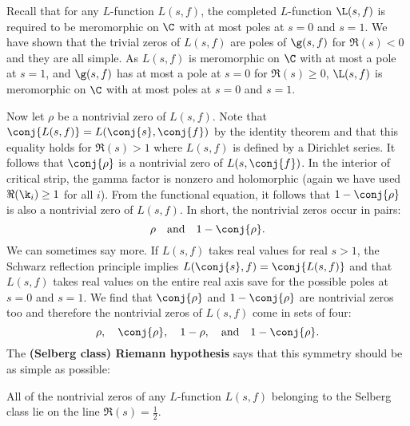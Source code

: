     \begin{remark}\label{rem:poles_of_completed_L_function}
      Recall that for any $L$-function $L(s,f)$, the completed $L$-function $\L(s,f)$ is required to be meromorphic on $\C$ with at most poles at $s = 0$ and $s = 1$. We have shown that the trivial zeros of $L(s,f)$ are poles of $\g(s,f)$ for $\Re(s) < 0$ and they are all simple. As $L(s,f)$ is meromorphic on $\C$ with at most a pole at $s = 1$, and $\g(s,f)$ has at most a pole at $s = 0$ for $\Re(s) \ge 0$, $\L(s,f)$ is meromorphic on $\C$ with at most poles at $s = 0$ and $s = 1$.
    \end{remark}
    
    Now let $\rho$ be a nontrivial zero of $L(s,f)$. Note that $\conj{L(s,f)} = L(\conj{s},\conj{f})$ by the identity theorem and that this equality holds for $\Re(s) > 1$ where $L(s,f)$ is defined by a Dirichlet series. It follows that $\conj{\rho}$ is a nontrivial zero of $L(s,\conj{f})$. In the interior of critical strip, the gamma factor is nonzero and holomorphic (again we have used $\Re(\k_{i}) \ge 1$ for all $i$). From the functional equation, it follows that $1-\conj{\rho}$ is also a nontrivial zero of $L(s,f)$. In short, the nontrivial zeros occur in pairs:
    \[
      \rho \quad \text{and} \quad 1-\conj{\rho}.
    \]
    We can sometimes say more. If $L(s,f)$ takes real values for real $s > 1$, the Schwarz reflection principle implies $L(\conj{s},f) = \conj{L(s,f)}$ and that $L(s,f)$ takes real values on the entire real axis save for the possible poles at $s = 0$ and $ s = 1$. We find that $\conj{\rho}$ and $1-\conj{\rho}$ are nontrivial zeros too and therefore the nontrivial zeros of $L(s,f)$ come in sets of four:
    \[
      \rho, \quad \conj{\rho}, \quad 1-\rho, \quad \text{and} \quad 1-\conj{\rho}.
    \]
    The \textbf{(Selberg class) Riemann hypothesis} says that this symmetry should be as simple as possible:

    \begin{conjecture}
      All of the nontrivial zeros of any $L$-function $L(s,f)$ belonging to the Selberg class lie on the line $\Re(s) = \frac{1}{2}$.
    \end{conjecture}

